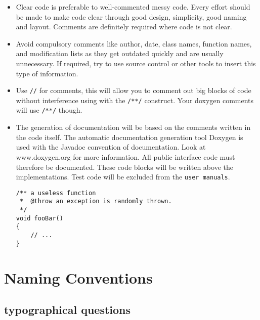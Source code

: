 \documentclass[10pt,a4paper,titlepage,dutch]{report}
\begin{document}
\begin{itemize}

\item Clear code is preferable to well-commented messy code. Every
effort should be made to make code clear through good design,
simplicity, good naming and layout. Comments are definitely
required where code is not clear.

\item Avoid compulsory comments like author, date, class names, function
names, and modification lists as they get outdated quickly and are
usually unnecessary. If required, try to use source control or
other tools to insert this type of information.

\item Use \verb|//| for comments, this will allow you to comment out big
blocks of code without interference using with the \verb|/**/|
construct.  Your doxygen comments will use \verb|/**/| though.

\item The generation of documentation will be based on the comments
written in the code itself. The automatic documentation generation
tool Doxygen is used with the Javadoc convention of documentation.
Look at www.doxygen.org for more information.  All public
interface code must therefore be documented.  These code blocks will be
written above the implementations.  Test code will be
excluded from the \verb|user manuals|.

\verb|/** a useless function|\\
\verb| *  @throw an exception is randomly thrown.|\\
\verb| */|\\
\verb|void fooBar()|\\
\verb|{|\\
\verb|    // ...|\\
\verb|}|

\end{itemize}


\chapter{Naming Conventions}

\section{typographical questions}
\end{document}
